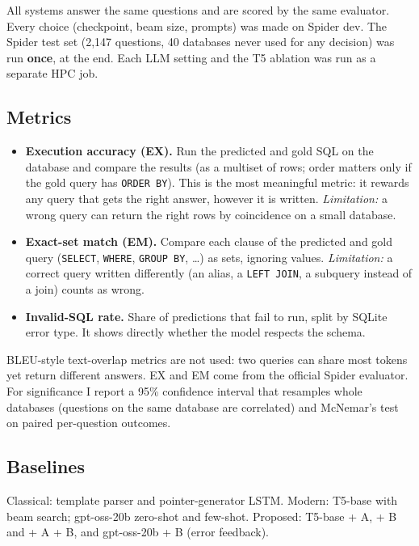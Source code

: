 \documentclass[
  10pt,
]{article}
\providecommand{\tightlist}{%
  \setlength{\itemsep}{0pt}\setlength{\parskip}{0pt}}
\begin{document}
All systems answer the same questions and are scored by the same
evaluator. Every choice (checkpoint, beam size, prompts) was made on
Spider dev. The Spider test set (2,147 questions, 40 databases never
used for any decision) was run \textbf{once}, at the end. Each LLM
setting and the T5 ablation was run as a separate HPC job.

\subsection{Metrics}\label{metrics}

\begin{itemize}
\tightlist
\item
  \textbf{Execution accuracy (EX).} Run the predicted and gold SQL on
  the database and compare the results (as a multiset of rows; order
  matters only if the gold query has \texttt{ORDER\ BY}). This is the
  most meaningful metric: it rewards any query that gets the right
  answer, however it is written. \emph{Limitation:} a wrong query can
  return the right rows by coincidence on a small database.
\item
  \textbf{Exact-set match (EM).} Compare each clause of the predicted
  and gold query (\texttt{SELECT}, \texttt{WHERE}, \texttt{GROUP\ BY},
  \ldots) as sets, ignoring values. \emph{Limitation:} a correct query
  written differently (an alias, a \texttt{LEFT\ JOIN}, a subquery
  instead of a join) counts as wrong.
\item
  \textbf{Invalid-SQL rate.} Share of predictions that fail to run,
  split by SQLite error type. It shows directly whether the model
  respects the schema.
\end{itemize}

BLEU-style text-overlap metrics are not used: two queries can share most
tokens yet return different answers. EX and EM come from the official
Spider evaluator. For significance I report a 95\% confidence interval
that resamples whole databases (questions on the same database are
correlated) and McNemar's test on paired per-question outcomes.

\subsection{Baselines}\label{baselines}

Classical: template parser and pointer-generator LSTM. Modern: T5-base
with beam search; gpt-oss-20b zero-shot and few-shot. Proposed: T5-base
+ A, + B and + A + B, and gpt-oss-20b + B (error feedback).
\end{document}
